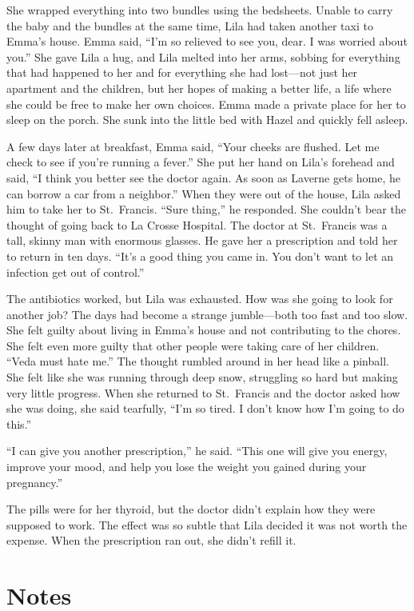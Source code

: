 \documentclass[
  american,
  letterpaper,
]{book}
\begin{document}
She wrapped everything into two bundles using the bedsheets. Unable to
carry the baby and the bundles at the same time, Lila had taken another
taxi to Emma's house. Emma said, ``I'm so relieved to see you, dear. I
was worried about you.'' She gave Lila a hug, and Lila melted into her
arms, sobbing for everything that had happened to her and for everything
she had lost---not just her apartment and the children, but her hopes of
making a better life, a life where she could be free to make her own
choices. Emma made a private place for her to sleep on the porch. She
sunk into the little bed with Hazel and quickly fell asleep.

A few days later at breakfast, Emma said, ``Your cheeks are flushed. Let
me check to see if you're running a fever.'' She put her hand on Lila's
forehead and said, ``I think you better see the doctor again. As soon as
Laverne gets home, he can borrow a car from a neighbor.'' When they were
out of the house, Lila asked him to take her to St.~Francis. ``Sure
thing,'' he responded. She couldn't bear the thought of going back to La
Crosse Hospital. The doctor at St.~Francis was a tall, skinny man with
enormous glasses. He gave her a prescription and told her to return in
ten days. ``It's a good thing you came in. You don't want to let an
infection get out of control.''

The antibiotics worked, but Lila was exhausted. How was she going to
look for another job? The days had become a strange jumble---both too
fast and too slow. She felt guilty about living in Emma's house and not
contributing to the chores. She felt even more guilty that other people
were taking care of her children. ``Veda must hate me.'' The thought
rumbled around in her head like a pinball. She felt like she was running
through deep snow, struggling so hard but making very little progress.
When she returned to St.~Francis and the doctor asked how she was doing,
she said tearfully, ``I'm so tired. I don't know how I'm going to do
this.''

``I can give you another prescription,'' he said. ``This one will give
you energy, improve your mood, and help you lose the weight you gained
during your pregnancy.''

The pills were for her thyroid, but the doctor didn't explain how they
were supposed to work. The effect was so subtle that Lila decided it was
not worth the expense. When the prescription ran out, she didn't refill
it.

\section{Notes}\label{notes-49}
\end{document}
